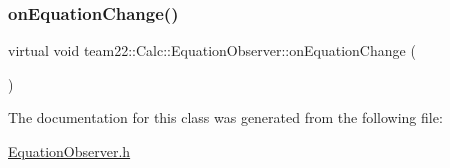 \subsubsection{\texorpdfstring{on\+Equation\+Change()}{onEquationChange()}}
{\footnotesize\ttfamily virtual void team22\+::\+Calc\+::\+Equation\+Observer\+::on\+Equation\+Change (\begin{DoxyParamCaption}{ }\end{DoxyParamCaption})\hspace{0.3cm}{\ttfamily [pure virtual]}}



The documentation for this class was generated from the following file\+:\begin{DoxyCompactItemize}
\item 
\hyperlink{_equation_observer_8h}{Equation\+Observer.\+h}\end{DoxyCompactItemize}
